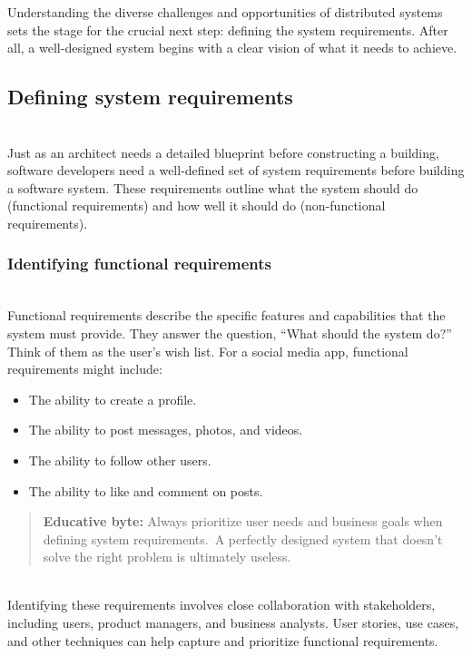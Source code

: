 Understanding the diverse challenges and opportunities of distributed systems sets the stage for the crucial next step: defining the system requirements. After all, a well-designed system begins with a clear vision of what it needs to achieve.

\subsection{Defining system requirements}\label{AGGqKq6eQ_SY3AgHMX2Jq}
\\
Just as an architect needs a detailed blueprint before constructing a building, software developers need a well-defined set of system requirements before building a software system. These requirements outline what the system should do (functional requirements) and how well it should do (non-functional requirements).

\subsubsection{Identifying functional requirements}\label{yD_irvDIwEeRmvgh-H_u2}
\\
Functional requirements describe the specific features and capabilities that the system must provide. They answer the question, ``What should the system do?'' Think of them as the user's wish list. For a social media app, functional requirements might include:

\begin{itemize}
\item
\protect{}\label{0ICczWeuO-yH539PPpQVK}
The ability to create a profile.
\item
\protect{}\label{U5Ux7YP0rzA1bDrOWt0cN}
The ability to post messages, photos, and videos.
\item
\protect{}\label{3jD0bfwOiaDLjYgTNgq5m}
The ability to follow other users.
\item
\protect{}\label{o1_pvYhD7yFYKo4vB-Wmj}
The ability to like and comment on posts.
\end{itemize}
\begin{quote}
\textbf{Educative byte:} Always prioritize user needs and business goals when defining system requirements.~A perfectly designed system that doesn't solve the right problem is ultimately useless.
\end{quote}
\\
Identifying these requirements involves close collaboration with stakeholders, including users, product managers, and business analysts. User stories, use cases, and other techniques can help capture and prioritize functional requirements.


